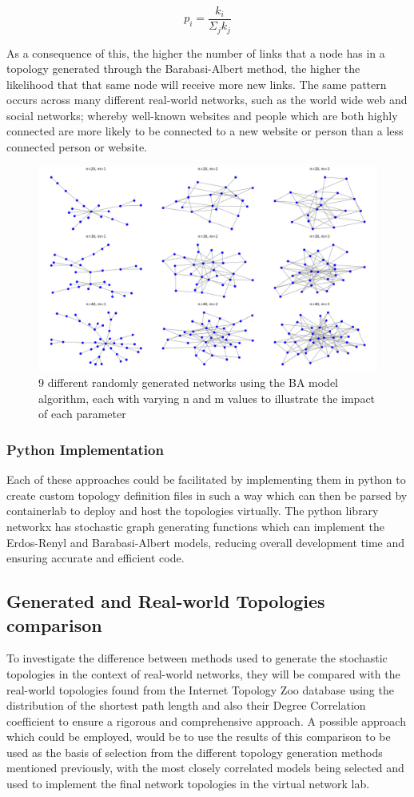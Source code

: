 \begin{equation} \label{eq:3}
    p_i = \frac{k_i}{\Sigma_jk_j}
\end{equation}

As a consequence of this, the higher the number of links that a node has in a topology generated through the Barabasi-Albert method, the higher the likelihood that that same node will receive more new links. The same pattern occurs across many different real-world networks, such as the world wide web and social networks; whereby well-known websites and people which are both highly connected are more likely to be connected to a new website or person than a less connected person or website.  

\begin{figure}
    \centering
    \includegraphics[width=0.75\linewidth]{images/BA_9.png}
    \caption{9 different randomly generated networks using the BA model algorithm, each with varying n and m values to illustrate the impact of each parameter}
    \label{fig:BA_9}
\end{figure}


\subsubsection{Python Implementation}
Each of these approaches could be facilitated by implementing them in python to create custom topology definition files in such a way which can then be parsed by containerlab to deploy and host the topologies virtually. 
The python library networkx \cite{networkX} has stochastic graph generating functions which can implement the Erdos-Renyl and Barabasi-Albert models, reducing overall development time and ensuring accurate and efficient code. 

\subsection{Generated and Real-world Topologies comparison}
To investigate the difference between methods used to generate the stochastic topologies in the context of real-world networks, they will be compared with the real-world topologies found from the Internet Topology Zoo database using the distribution of the shortest path length and also their Degree Correlation coefficient to ensure a rigorous and comprehensive approach. A possible approach which could be employed, would be to use the results of this comparison to be used as the basis of selection from the different topology generation methods mentioned previously, with the most closely correlated models  being selected and used to implement the final network topologies in the virtual network lab. 

